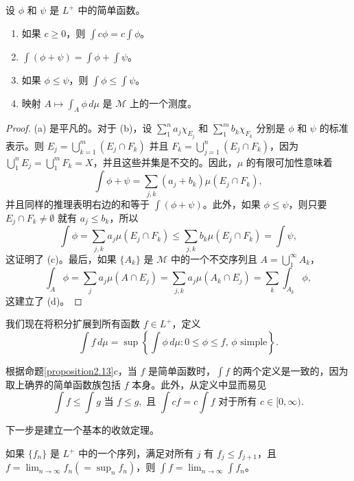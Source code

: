 \documentclass[lang=cn,10pt,thmcnt=section]{elegantbook}
\begin{document}
\begin{proposition}\label{proposition2.13}
设 $\phi$ 和 $\psi$ 是 $L^+$ 中的简单函数。
\begin{enumerate}[label=\alph*.]
    \item 如果 $c \ge 0$，则 $\int c\phi = c \int \phi$。
    \item $\int(\phi + \psi) = \int \phi + \int \psi$。
    \item 如果 $\phi \le \psi$，则 $\int \phi \le \int \psi$。
    \item 映射 $A \mapsto \int_A \phi \,d\mu$ 是 $\mathcal{M}$ 上的一个测度。
\end{enumerate}
\end{proposition}

\begin{proof}
(a) 是平凡的。对于 (b)，设 $\sum_1^n a_j \chi_{E_j}$ 和 $\sum_1^m b_k \chi_{F_k}$ 分别是 $\phi$ 和 $\psi$ 的标准表示。则 $E_j = \bigcup_{k=1}^m (E_j \cap F_k)$ 并且 $F_k = \bigcup_{j=1}^n (E_j \cap F_k)$，因为 $\bigcup_1^n E_j = \bigcup_1^m F_k = X$，并且这些并集是不交的。因此，$\mu$ 的有限可加性意味着
\[ \int \phi + \psi = \sum_{j,k} (a_j + b_k) \mu(E_j \cap F_k), \]
并且同样的推理表明右边的和等于 $\int(\phi + \psi)$。此外，如果 $\phi \le \psi$，则只要 $E_j \cap F_k \neq \emptyset$ 就有 $a_j \le b_k$，所以
\[ \int \phi = \sum_{j,k} a_j \mu(E_j \cap F_k) \le \sum_{j,k} b_k \mu(E_j \cap F_k) = \int \psi, \]
这证明了 (c)。最后，如果 $\{A_k\}$ 是 $\mathcal{M}$ 中的一个不交序列且 $A = \bigcup_1^\infty A_k$，
\[ \int_A \phi = \sum_j a_j \mu(A \cap E_j) = \sum_{j,k} a_j \mu(A_k \cap E_j) = \sum_k \int_{A_k} \phi, \]
这建立了 (d)。
\end{proof}

我们现在将积分扩展到所有函数 $f \in L^+$，定义
\[ \int f \,d\mu = \sup \left\{\int \phi \,d\mu : 0 \leq \phi \leq f, \, \phi \text{ simple} \right\}. \]

根据命题\ref{proposition2.13}c，当 $f$ 是简单函数时，$\int f$ 的两个定义是一致的，因为取上确界的简单函数族包括 $f$ 本身。此外，从定义中显而易见
\[ \int f \leq \int g \text{ 当 } f \leq g, \text{ 且 } \int cf = c \int f \text{ 对于所有 } c \in [0, \infty). \]

下一步是建立一个基本的收敛定理。

\begin{theorem}[单调收敛定理]\label{theorem2.14}
如果 $\{f_n\}$ 是 $L^+$ 中的一个序列，满足对所有 $j$ 有 $f_j \leq f_{j+1}$，且 $f = \lim_{n\to\infty} f_n (= \sup_n f_n)$，则 $\int f = \lim_{n\to\infty} \int f_n$。
\end{theorem}
\end{document}
